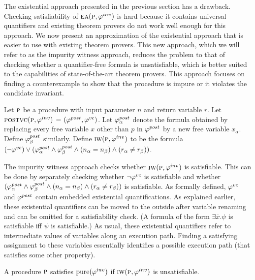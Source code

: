 The existential approach presented in the previous section has a drawback. Checking satisfiability of $\textsc{ea}(\textsc{p},\varphi^{inv})$
is hard because it contains universal quantifiers and existing theorem provers do not work well enough for this
approach. We now present an approximation of the existential approach that is easier to use with existing theorem
provers. This new approach, which we will refer to as the impurity witness approach, reduces the problem to
that of checking whether a quantifier-free formula is unsatisfiable, which is better suited to the capabilities of
state-of-the-art theorem provers. This approach focuses on finding a counterexample to show that the
procedure is impure or it violates the candidate invariant.

Let $\textsc{p}$ be a procedure with input parameter $n$ and return variable $r$.
Let $\textsc{postvc}({\textsc{p}},{\varphi^{inv}})$ = $(\varphi^{post},\varphi^{vc})$.
Let $\varphi^{post}_\alpha$ denote the formula obtained by replacing every free variable $x$ other than $p$ in $\varphi^{post}$
by a new free variable $x_\alpha$. Define $\varphi^{post}_\beta$ similarly.
Define $\textsc{iw}(\textsc{p}, \varphi^{inv})$ to be the formula $(\neg \varphi^{vc}) \vee (\varphi^{post}_\alpha \wedge \varphi^{post}_\beta \wedge (n_\alpha = n_\beta) \wedge (r_\alpha \neq r_\beta))$.

The impurity witness approach checks whether $\textsc{iw}(\textsc{p}, \varphi^{inv})$ is satisfiable. This can be done by separately checking
whether $\neg \varphi^{vc}$ is satisfiable and whether $(\varphi^{post}_\alpha \wedge \varphi^{post}_\beta \wedge (n_\alpha = n_\beta) \wedge (r_\alpha \neq r_\beta))$
is satisfiable. As formally defined, $\varphi^{vc}$ and $\varphi^{post}$ contain embedded existential quantifications. As explained earlier,
these existential quantifiers can be moved to the outside after variable renaming and can be omitted for a satisfiability check.
(A formula of the form $\exists \overline{x}. \psi$ is satisfiable iff $\psi$ is satisfiable.)
As usual, these existential quantifiers refer to intermediate values of variables along an execution path.
Finding a satisfying assignment to these variables essentially identifies a possible execution path (that
satisfies some other property).

\begin{theorem}
A procedure $\textsc{p}$ satisfies  $\mathrm{pure}(\varphi^{inv})$ if $\textsc{iw}(\textsc{p}, \varphi^{inv})$ is unsatisfiable.
\end{theorem}

